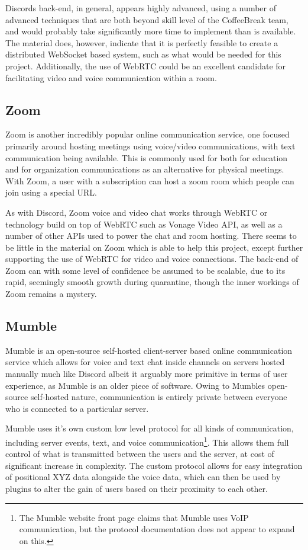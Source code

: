 Discords back-end, in general, appears highly advanced, using a number of advanced techniques that are both beyond skill level of the CoffeeBreak team, and would probably take significantly more time to implement than is available. The material does, however, indicate that it is perfectly feasible to create a distributed WebSocket based system, such as what would be needed for this project. Additionally, the use of WebRTC could be an excellent candidate for facilitating video and voice communication within a room.

\subsection{Zoom}

Zoom is another incredibly popular online communication service, one focused primarily around hosting meetings using voice/video communications, with text communication being available. This is commonly used for both for education and for organization communications as an alternative for physical meetings. With Zoom, a user with a subscription can host a zoom room which people can join using a special URL.\cite{zoom}

As with Discord, Zoom voice and video chat works through WebRTC or technology build on top of WebRTC such as Vonage Video API\cite{vonageapi}, as well as a number of other APIs used to power the chat and room hosting.\cite{zoom} There seems to be little in the material on Zoom which is able to help this project, except further supporting the use of WebRTC for video and voice connections. The back-end of Zoom can with some level of confidence be assumed to be scalable, due to its rapid, seemingly smooth growth during quarantine, though the inner workings of Zoom remains a mystery.

\subsection{Mumble}

Mumble is an open-source self-hosted client-server based online communication service which allows for voice and text chat inside channels on servers hosted manually much like Discord albeit it arguably more primitive in terms of user experience, as Mumble is an older piece of software. Owing to Mumbles open-source self-hosted nature, communication is entirely private between everyone who is connected to a particular server.\cite{mumbleprotocol}

Mumble uses it's own custom low level protocol for all kinds of communication, including server events, text, and voice communication\footnote{The Mumble website front page claims that Mumble uses VoIP communication, but the protocol documentation does not appear to expand on this.\cite{mumble}}. This allows them full control of what is transmitted between the users and the server, at cost of significant increase in complexity. The custom protocol allows for easy integration of positional XYZ data alongside the voice data, which can then be used by plugins to alter the gain of users based on their proximity to each other.\cite{mumblevoicedata}

